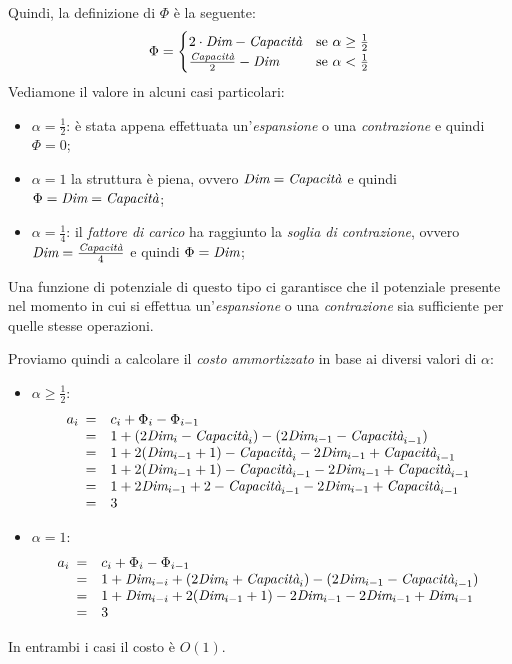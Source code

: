 Quindi, la definizione di $\Phi$ è la seguente:
\[\Phi=\begin{cases}
    2\cdot\emph{Dim}-\emph{Capacità} & \text{se}\ \alpha\geq\frac{1}{2}\\
    \frac{\emph{Capacità}}{2}-\emph{Dim} & \text{se}\ \alpha<\frac{1}{2}
\end{cases}\]
Vediamone il valore in alcuni casi particolari:
\begin{itemize}
    \item $\alpha=\frac{1}{2}$: è stata appena effettuata un'\emph{espansione} o
    una \emph{contrazione} e quindi $\Phi=0$;
    \item $\alpha=1$ la struttura è piena, ovvero $\emph{Dim}=\emph{Capacità}$
    e quindi $\Phi=\emph{Dim}=\emph{Capacità}$;
    \item $\alpha=\frac{1}{4}$: il \emph{fattore di carico} ha raggiunto la
    \emph{soglia di contrazione}, ovvero $\emph{Dim}=\frac{\emph{Capacità}}
    {4}$ e quindi $\Phi=\emph{Dim}$;
\end{itemize}
Una funzione di potenziale di questo tipo ci garantisce che il potenziale presente
nel momento in cui si effettua un'\emph{espansione} o una \emph{contrazione} sia
sufficiente per  quelle stesse operazioni.

Proviamo quindi a calcolare il \emph{costo ammortizzato} in base ai diversi valori
di $\alpha$:
\begin{itemize}
    \item $\alpha\geq\frac{1}{2}$:
    \[a_i\begin{array}[t]{cl}
        = & c_i + \Phi_i - \Phi_{i-1}\\
        = & 1 + (2\emph{Dim}_i - \emph{Capacità}_i) - (2\emph{Dim}_{i-1}-\emph{Capacità}_{i-1})\\
        = & 1 + 2(\emph{Dim}_{i-1}+1) - \emph{Capacità}_i - 2\emph{Dim}_{i-1}+\emph{Capacità}_{i-1}\\
        = & 1 + 2(\emph{Dim}_{i-1}+1) - \emph{Capacità}_{i-1} - 2\emph{Dim}_{i-1}+\emph{Capacità}_{i-1}\\
        = & 1 + 2\emph{Dim}_{i-1}+2 - \emph{Capacità}_{i-1} - 2\emph{Dim}_{i-1}+\emph{Capacità}_{i-1}\\
        = & 3
    \end{array}\]
    \item $\alpha=1$:
    \[a_i\begin{array}[t]{cl}
        = & c_i+\Phi_i-\Phi_{i-1}\\
        = & 1 + \emph{Dim}_{i-i}+(2\emph{Dim}_i+\emph{Capacità}_i)-(2\emph{Dim}_{i-1}-\emph{Capacità}_{i-1})\\
        = & 1 + \emph{Dim}_{i-i}+2(\emph{Dim}_{i-1}+1)-2\emph{Dim}_{i-1}-2\emph{Dim}_{i-1}+\emph{Dim}_{i-1}\\
        = & 3
    \end{array}\]
\end{itemize}
In entrambi i casi il costo è $O(1)$.

